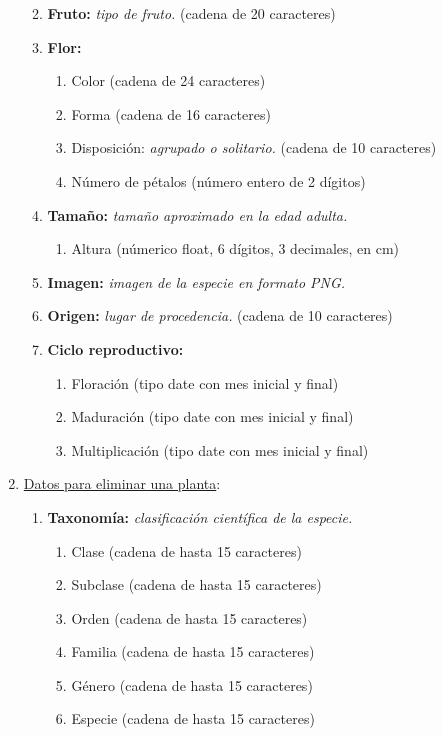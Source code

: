 \documentclass[10pt,a4paper]{article}
\begin{document}
\begin{enumerate}[label={RD\arabic*.} ,leftmargin=2.8\parindent]
\begin{enumerate}[label={RD3.\arabic*.}]
	\medskip	
	\item
		\textbf{Fruto:} \textit{tipo de fruto.} (cadena de 20 caracteres)

	\medskip
	\item
		\textbf{Flor:}
	\begin{enumerate} [label=-]
		\item Color (cadena de 24 caracteres)
		\item Forma (cadena de 16 caracteres)
		\item Disposición: \textit{agrupado o solitario.} (cadena de 10 caracteres)
		\item Número de pétalos (número entero de 2 dígitos)
	\end{enumerate}

	\medskip
	\item
		\textbf{Tamaño:} \textit{tamaño aproximado en la edad adulta.}
	\begin{enumerate}[label=-]
		\item Altura (númerico float, 6 dígitos, 3 decimales, en cm)
	\end{enumerate}
	
	\medskip	
	\item
		\textbf{Imagen:} \textit{imagen de la especie en formato PNG.}

	\medskip 
	\item
		\textbf{Origen:} \textit{lugar de procedencia.} (cadena de 10 caracteres)
		
	\medskip 
	\item
		\textbf{Ciclo reproductivo:}
	\begin{enumerate} [label=-]
		\item Floración (tipo date con mes inicial y final)
		\item Maduración (tipo date con mes inicial y final)
		\item Multiplicación (tipo date con mes inicial y final)
	\end{enumerate}				
	\medskip 
	\medskip
	\end{enumerate}
	
	\item \underline{Datos para eliminar una planta}:
	\begin{enumerate}[label={RD4.\arabic*.}]
	
	\item 
		\textbf{Taxonomía:} \textit{clasificación científica de la especie.}
	\begin{enumerate}[label=-]
		\item Clase (cadena de hasta 15 caracteres)
		\item Subclase (cadena de hasta 15 caracteres)
		\item Orden (cadena de hasta 15 caracteres)
		\item Familia (cadena de hasta 15 caracteres)
		\item Género (cadena de hasta 15 caracteres)
		\item Especie (cadena de hasta 15 caracteres)
	\end{enumerate}
	\medskip
	

\end{enumerate}
\end{enumerate}
\end{document}
